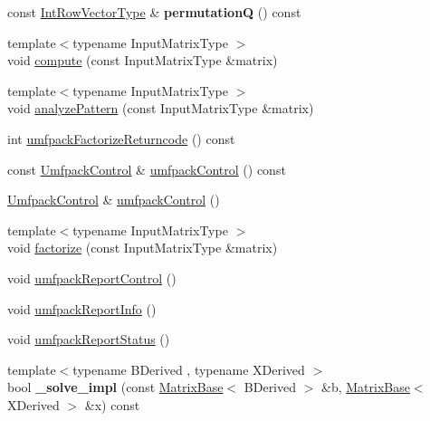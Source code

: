 \begin{DoxyCompactItemize}
\mbox{\label{class_eigen_1_1_umf_pack_l_u_ac28a1e26d4dab8d1ee7c5d10e9770668}} 
const \hyperlink{group___core___module}{Int\+Row\+Vector\+Type} \& {\bfseries permutationQ} () const
\item 
{\footnotesize template$<$typename Input\+Matrix\+Type $>$ }\\void \hyperlink{class_eigen_1_1_umf_pack_l_u_a05fb2b5717ebd67e46b83439721ceee7}{compute} (const Input\+Matrix\+Type \&matrix)
\item 
{\footnotesize template$<$typename Input\+Matrix\+Type $>$ }\\void \hyperlink{class_eigen_1_1_umf_pack_l_u_ac7ea28b2017d6b26b7b08497f294e5e6}{analyze\+Pattern} (const Input\+Matrix\+Type \&matrix)
\item 
int \hyperlink{class_eigen_1_1_umf_pack_l_u_a822fa9d82754269c379dc4ce17920b0a}{umfpack\+Factorize\+Returncode} () const
\item 
const \hyperlink{group___core___module}{Umfpack\+Control} \& \hyperlink{class_eigen_1_1_umf_pack_l_u_ae83d178202f3d44c1789c1c93842bf2e}{umfpack\+Control} () const
\item 
\hyperlink{group___core___module}{Umfpack\+Control} \& \hyperlink{class_eigen_1_1_umf_pack_l_u_a679bd267a0407d4ca985d97f0b864101}{umfpack\+Control} ()
\item 
{\footnotesize template$<$typename Input\+Matrix\+Type $>$ }\\void \hyperlink{class_eigen_1_1_umf_pack_l_u_a1471bf890503e743c45d75cc02a5345d}{factorize} (const Input\+Matrix\+Type \&matrix)
\item 
void \hyperlink{class_eigen_1_1_umf_pack_l_u_ac6ff58ef8eb8221e6af87de750d6619b}{umfpack\+Report\+Control} ()
\item 
void \hyperlink{class_eigen_1_1_umf_pack_l_u_afad062dfc49ca6d2d19d534b3f8f8d28}{umfpack\+Report\+Info} ()
\item 
void \hyperlink{class_eigen_1_1_umf_pack_l_u_a82497bbf75d995a6d4ae7e9191f79525}{umfpack\+Report\+Status} ()
\item 
\mbox{\label{class_eigen_1_1_umf_pack_l_u_a83a5aa7038e4920b79fefff82f49f610}} 
{\footnotesize template$<$typename B\+Derived , typename X\+Derived $>$ }\\bool {\bfseries \+\_\+solve\+\_\+impl} (const \hyperlink{group___core___module_class_eigen_1_1_matrix_base}{Matrix\+Base}$<$ B\+Derived $>$ \&b, \hyperlink{group___core___module_class_eigen_1_1_matrix_base}{Matrix\+Base}$<$ X\+Derived $>$ \&x) const

\end{DoxyCompactItemize}
